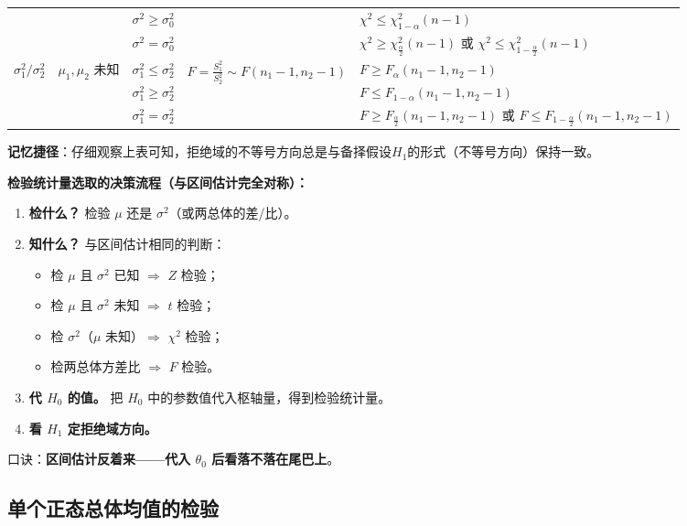 ﻿\documentclass[lang=cn,11pt]{elegantbook}
\begin{document}
\begin{table}[htbp]
{\begin{tabular}{lllll}
& & $\sigma^2 \geq \sigma_0^2$ & & $\chi^2 \leq \chi^2_{1-\alpha}(n-1)$ \\
& & $\sigma^2 = \sigma_0^2$ & & $\chi^2 \geq \chi^2_{\frac{\alpha}{2}}(n-1)$ 或 $\chi^2 \leq \chi^2_{1-\frac{\alpha}{2}}(n-1)$ \\
\midrule
\multirow{3}{*}{$\sigma_1^2 / \sigma_2^2$} & \multirow{3}{*}{$\mu_1,\mu_2$ 未知} & $\sigma_1^2 \leq \sigma_2^2$ & \multirow{3}{*}{$F = \frac{S_1^2}{S_2^2} \sim F(n_1-1,n_2-1)$} & $F \geq F_\alpha(n_1-1,n_2-1)$ \\
& & $\sigma_1^2 \geq \sigma_2^2$ & & $F \leq F_{1-\alpha}(n_1-1,n_2-1)$ \\
& & $\sigma_1^2 = \sigma_2^2$ & & $F \geq F_{\frac{\alpha}{2}}(n_1-1,n_2-1)$ 或 $F \leq F_{1-\frac{\alpha}{2}}(n_1-1,n_2-1)$ \\
\bottomrule
\end{tabular}
}
\end{table}
\begin{remark} \label{rem:rejection_region}
\textbf{记忆捷径}：仔细观察上表可知，拒绝域的不等号方向总是与备择假设$H_1$的形式（不等号方向）保持一致。
\end{remark}

\begin{note}
\textbf{检验统计量选取的决策流程（与区间估计完全对称）：}
\begin{enumerate}
    \item \textbf{检什么？} 检验 $\mu$ 还是 $\sigma^2$（或两总体的差/比）。
    \item \textbf{知什么？} 与区间估计相同的判断：
    \begin{itemize}
        \item 检 $\mu$ 且 $\sigma^2$ 已知 $\Longrightarrow$ $Z$ 检验；
        \item 检 $\mu$ 且 $\sigma^2$ 未知 $\Longrightarrow$ $t$ 检验；
        \item 检 $\sigma^2$（$\mu$ 未知）$\Longrightarrow$ $\chi^2$ 检验；
        \item 检两总体方差比 $\Longrightarrow$ $F$ 检验。
    \end{itemize}
    \item \textbf{代 $H_0$ 的值。} 把 $H_0$ 中的参数值代入枢轴量，得到检验统计量。
    \item \textbf{看 $H_1$ 定拒绝域方向。}
\end{enumerate}
口诀：\textbf{区间估计反着来——代入 $\theta_0$ 后看落不落在尾巴上}。
\end{note}

\subsection{单个正态总体均值的检验}
\end{document}
